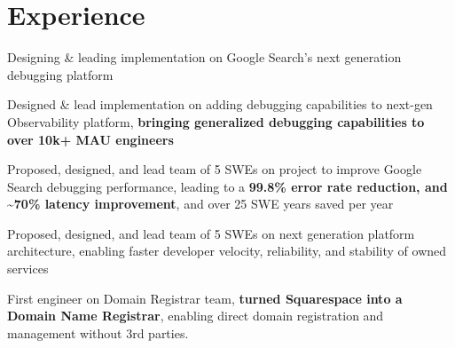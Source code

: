 \documentclass[]{two-column-resume}
\begin{document}
\begin{minipage}[t]{0.65\textwidth}

%
%
\section{Experience}

        \vspace{\topsep} %
        \begin{tightemize}
                            \item Designing \& leading implementation on Google Search's next generation debugging platform
                            \item Designed \& lead implementation on adding debugging capabilities to next-gen Observability platform, \textbf{bringing generalized debugging capabilities to over 10k+ MAU engineers}
                    \end{tightemize}
        \sectionsep
        \vspace{\topsep} %
        \begin{tightemize}
                            \item Proposed, designed, and lead team of 5 SWEs on project to improve Google Search debugging performance, leading to a \textbf{99.8\% error rate reduction, and \textasciitilde70\% latency improvement}, and over 25 SWE years saved per year
                            \item Proposed, designed, and lead team of 5 SWEs on next generation platform architecture, enabling faster developer velocity, reliability, and stability of owned services
                    \end{tightemize}
        \sectionsep
        \vspace{\topsep} %
        \begin{tightemize}
                            \item First engineer on Domain Registrar team, \textbf{turned Squarespace into a Domain Name Registrar}, enabling direct domain registration and management without 3rd parties.

\end{tightemize}
\end{minipage}
\end{document}
